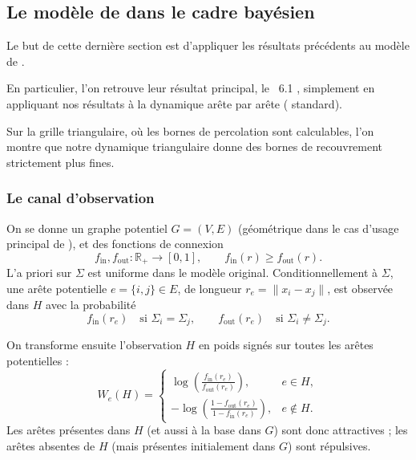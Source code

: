 \subsection{Le modèle de  dans le cadre bayésien}
\label{sec:chapII_SB}

Le but de cette dernière section est d'appliquer les résultats précédents au modèle de \SB{} \cite{SankararamanBaccelli2018}.

En particulier, l'on retrouve leur résultat principal, le \Th~6.1 \cite{SankararamanBaccelli2018}, simplement en appliquant nos résultats à la dynamique arête par arête (\SW{} standard).

Sur la grille triangulaire, où les bornes de percolation sont calculables, l'on montre que notre dynamique triangulaire donne des bornes de recouvrement strictement plus fines.

\subsubsection{Le canal d'observation}

On se donne un graphe potentiel $G=(V,E)$ (géométrique dans le cas d'usage principal de \SB{}), et des fonctions de connexion
\[
    f_{\mathrm{in}},f_{\mathrm{out}}:\mathbb R_+\to[0,1],
    \qquad
    f_{\mathrm{in}}(r)\ge f_{\mathrm{out}}(r).
\]
L'a priori sur $\Sigma$ est uniforme dans le modèle original. Conditionnellement à $\Sigma$, une arête potentielle $e=\{i,j\} \in E$, de longueur $r_e=\|x_i-x_j\|$, est observée dans $H$ avec la probabilité
\[
    f_{\mathrm{in}}(r_e)\quad\text{si }\Sigma_i=\Sigma_j,
    \qquad
    f_{\mathrm{out}}(r_e)\quad\text{si }\Sigma_i\neq\Sigma_j.
\]

On transforme ensuite l'observation $H$ en poids signés sur toutes les arêtes potentielles :
\begin{equation}
    W_e(H)=
    \begin{cases}
        \displaystyle \log\left(\frac{f_{\mathrm{in}}(r_e)}{f_{\mathrm{out}}(r_e)}\right),& e\in H,\\[2ex]
        \displaystyle -\log\left(\frac{1-f_{\mathrm{out}}(r_e)}{1-f_{\mathrm{in}}(r_e)}\right),& e\notin H.
    \end{cases}
    \label{eq:chapII_SB_weights}
\end{equation}
Les arêtes présentes dans $H$ (et aussi à la base dans $G$) sont donc attractives ; les arêtes absentes de $H$ (mais présentes initialement dans $G$) sont répulsives. %

